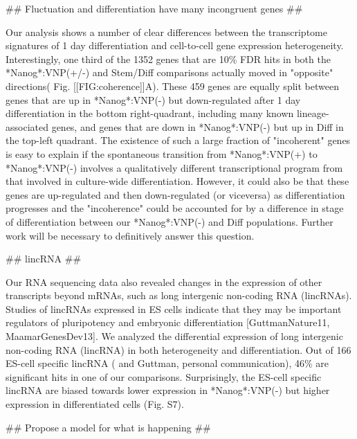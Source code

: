 \documentclass[aps,prl,twocolumn,superscriptaddress]{revtex4}
\begin{document}
## Fluctuation and differentiation have many incongruent genes ##

Our analysis shows a number of clear differences between the transcriptome signatures of 1 day differentiation and cell-to-cell gene expression heterogeneity. Interestingly, one third of the 1352 genes that are 10\% FDR hits in both the *Nanog*:VNP(+/-) and Stem/Diff comparisons actually moved in "opposite" directions( Fig. [[FIG:coherence]]A). These 459 genes are equally split between genes that are up in *Nanog*:VNP(-) but down-regulated after 1 day differentiation in the bottom right-quadrant, including many known lineage-associated genes, and genes that are down in *Nanog*:VNP(-) but up in Diff in the top-left quadrant. The existence of such a large fraction of "incoherent" genes is easy to explain if the spontaneous transition from *Nanog*:VNP(+) to *Nanog*:VNP(-) involves a qualitatively different transcriptional program from that involved in culture-wide differentiation. However, it could also be that these genes are up-regulated and then down-regulated (or viceversa) as differentiation progresses and the "incoherence" could be accounted for by a difference in stage of differentiation between our *Nanog*:VNP(-) and Diff populations. Further work will be necessary to definitively answer this question. 

## lincRNA ##

Our RNA sequencing data also revealed changes in the expression of other transcripts beyond mRNAs, such as long intergenic non-coding RNA (lincRNAs). Studies of lincRNAs expressed in ES cells indicate that they may be important regulators of pluripotency and embryonic differentiation [GuttmanNature11, MaamarGenesDev13]. We analyzed the differential expression of long intergenic non-coding RNA (lincRNA) in both heterogeneity and differentiation. Out of 166 ES-cell specific lincRNA (\citet{GuttmanNature11} and Guttman, personal communication), 46\% are significant hits in one of our comparisons. Surprisingly, 
the ES-cell specific lincRNA are biased towards lower expression in *Nanog*:VNP(-) but higher expression in differentiated cells (Fig. S7).





## Propose a model for what is happening ##
\end{document}
